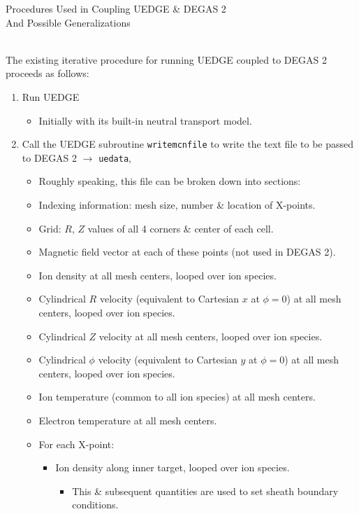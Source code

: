 \documentclass[11pt]{article}
\begin{document}
\begin{centering}
\Large
Procedures Used in Coupling UEDGE \& DEGAS 2 \\
And Possible Generalizations \\
\end{centering}
\ \\

The existing iterative procedure for running UEDGE coupled to DEGAS 2 proceeds as follows:
\begin{enumerate}
  \item Run UEDGE 
  \begin{itemize}
    \item Initially with its built-in neutral transport model.
  \end{itemize}
  \item Call the UEDGE subroutine {\tt writemcnfile} to write the text file to be passed to DEGAS 2 $\rightarrow$ {\tt uedata},
  \begin{itemize}
    \item Roughly speaking, this file can be broken down into sections:
    \item Indexing information: mesh size, number \& location of X-points.
    \item Grid: $R$, $Z$ values of all 4 corners \& center of each cell.
    \item Magnetic field vector at each of these points (not used in DEGAS 2).
    \item Ion density at all mesh centers, looped over ion species.
    \item Cylindrical $R$ velocity (equivalent to Cartesian $x$ at $\phi = 0$) at all mesh centers, looped over ion species.
    \item Cylindrical $Z$ velocity at all mesh centers, looped over ion species.
    \item Cylindrical $\phi$ velocity (equivalent to Cartesian $y$ at $\phi = 0$) at all mesh centers, looped over ion species.
    \item Ion temperature (common to all ion species) at all mesh centers.
    \item Electron temperature at all mesh centers.
    \item For each X-point:
    \begin{itemize}
      \item Ion density along inner target, looped over ion species.
      \begin{itemize}
        \item This \& subsequent quantities are used to set sheath boundary conditions.

\end{itemize}
\end{itemize}
\end{itemize}
\end{enumerate}
\end{document}
